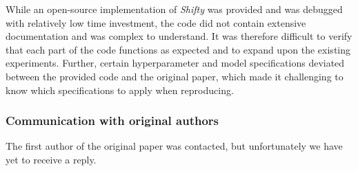 While an open-source implementation of \textit{Shifty} was provided and was debugged with relatively low time investment, the code did not contain extensive documentation and was complex to understand. It was therefore difficult to verify that each part of the code functions as expected and to expand upon the existing experiments. Further, certain hyperparameter and model specifications deviated between the provided code and the original paper, which made it challenging to know which specifications to apply when reproducing.


\subsubsection*{Communication with original authors}

The first author of the original paper was contacted, but unfortunately we have yet to receive a reply.